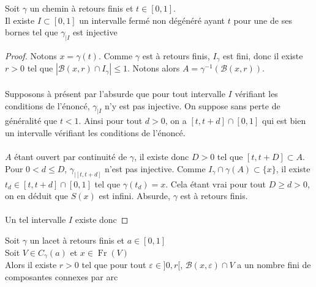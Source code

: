 \documentclass{article}
\begin{document}
\begin{flushleft}
\begin{tcolorbox}[colback = purple!20!white, colframe = purple!60!white, title = Proposition ?]
    Soit $\gamma$ un chemin à retours finis et $t \in [0, 1]$.\\
    Il existe $I \subset [0, 1]$ un intervalle fermé non dégénéré ayant $t$ pour une de ses bornes
    tel que $\gamma_{\mid I}$ est injective
\end{tcolorbox}

\begin{proof}
    Notons $x = \gamma(t)$. Comme $\gamma$ est à retours finis, $I_{\gamma}$ est fini, donc
    il existe $r > 0$ tel que $|\mathcal{B}(x, r) \cap I_{\gamma}| \leq 1$. Notons alors
    $A = \gamma^{-1}(\mathcal{B}(x, r))$.
    \\~\\
    Supposons à présent par l'absurde que pour tout intervalle $I$ vérifiant les
    conditions de l'énoncé, $\gamma_{\mid I}$ n'y est pas injective. On suppose sans
    perte de généralité que $t < 1$. Ainsi pour tout $d > 0$, on a $[t, t+d] \cap [0, 1]$
    qui est bien un intervalle vérifiant les conditions de l'énoncé.
    \\~\\
    $A$ étant ouvert par continuité de $\gamma$, il existe donc $D > 0$ tel que
    $[t, t+D] \subset A$.\\
    Pour $0 < d \leq D$, $\gamma_{\mid [t, t+d]}$ n'est pas injective. Comme
    $I_{\gamma} \cap \gamma(A) \subset \{ x \}$, il existe $t_d \in [t, t+d] \cap [0, 1]$
    tel que $\gamma(t_d) = x$. Cela étant vrai pour tout $D \geq d > 0$, on en déduit que $S(x)$
    est infini. Absurde, $\gamma$ est à retours finis.
    \\~\\
    Un tel intervalle $I$ existe donc
\end{proof}

\begin{tcolorbox}[colback = purple!20!white, colframe = purple!60!white, title = Lemme 2]
    Soit $\gamma$ un lacet à retours finis et $a \in [0, 1]$\\
    Soit $V \in C_{\gamma}(a)$ et $x \in \operatorname{Fr}(V)$\\
    Alors il existe $r > 0$ tel que pour tout $\varepsilon \in ]0, r[$, $\mathcal{B}(x, \varepsilon) \cap V$
    a un nombre fini de composantes connexes par arc
\end{tcolorbox}


\end{flushleft}
\end{document}
